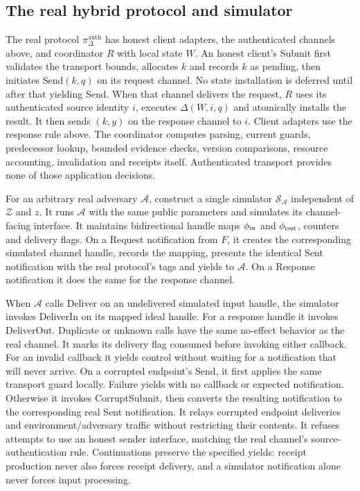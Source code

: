 \subsection{The real hybrid protocol and simulator}
\label{app:uc-simulator}
The real protocol $\pi_\Delta^{\mathrm{auth}}$ has honest client adapters,
the authenticated channels above, and coordinator $R$ with local state $W$.
An honest client's Submit first validates the transport bounds, allocates
$k$ and records $k$ as pending, then initiates Send$(k,q)$ on its request
channel. No state installation is deferred until after that yielding Send.
When that channel delivers the request, $R$
uses its authenticated source identity $i$, executes $\Delta(W,i,q)$
and atomically installs the result. It then sends $(k,y)$ on the
response channel to $i$. Client adapters use the response rule above.
The coordinator computes parsing, current guards, predecessor lookup,
bounded evidence checks, version comparisons, resource accounting,
invalidation and receipts itself. Authenticated transport provides
none of those application decisions.

For an arbitrary real adversary $\mathcal A$, construct a single simulator
$\mathcal S_{\mathcal A}$ independent of $\mathcal Z$ and $z$.
It runs $\mathcal A$ with the same public parameters and simulates its
channel-facing interface. It maintains bidirectional handle maps
$\phi_{\rm in}$ and $\phi_{\rm out}$, counters and delivery flags.
On a Request notification from $F$, it creates the corresponding simulated
channel handle, records the mapping, presents the identical Sent
notification with the real protocol's tags and yields to $\mathcal A$.
On a Response notification it does the same for the response channel.

When $\mathcal A$ calls Deliver on an undelivered simulated input handle,
the simulator invokes DeliverIn on its mapped ideal handle. For a response
handle it invokes DeliverOut. Duplicate or unknown calls have the same
no-effect behavior as the real channel. It marks its delivery flag consumed
before invoking either callback. For an invalid callback it yields control
without waiting for a notification that will never arrive.
On a corrupted endpoint's Send,
it first applies the same transport guard locally. Failure yields with
no callback or expected notification. Otherwise it invokes CorruptSubmit,
then converts the resulting notification to
the corresponding real Sent notification. It relays corrupted endpoint
deliveries and environment/adversary traffic without restricting their
contents. It refuses attempts to use an honest sender interface, matching
the real channel's source-authentication rule.
Continuations preserve the specified yields: receipt production never
also forces receipt delivery, and a simulator notification alone never
forces input processing.

